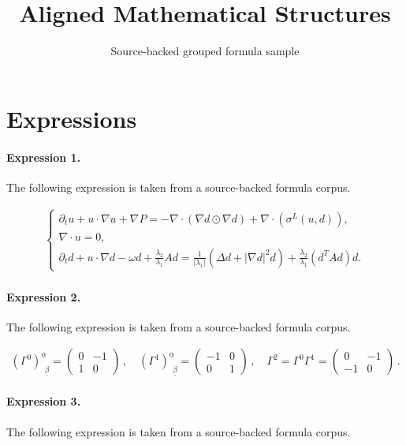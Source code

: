 \documentclass[11pt]{article}
\title{Aligned Mathematical Structures}
\author{Source-backed grouped formula sample}
\date{}
\begin{document}
\maketitle
\section{Expressions}
\paragraph{Expression 1.} The following expression is taken from a source-backed formula corpus.

\begin{align*}\begin{cases}\partial_t u+u\cdot \nabla u+\nabla P=-\nabla\cdot(\nabla d\odot\nabla d)+\nabla\cdot(\sigma^L(u,d)),\\\nabla\cdot u = 0,\\\partial_t d+u\cdot\nabla d-\omega d+\frac{\lambda_2}{\lambda_1} Ad=\frac{1}{|\lambda_1|}\left(\Delta d+|\nabla d|^2d\right)+\frac{\lambda_2}{\lambda_1}\left(d^TAd\right) d.\end{cases}\end{align*}

\paragraph{Expression 2.} The following expression is taken from a source-backed formula corpus.

\begin{align*}(\Gamma^{0})^{\underline\alpha}_{~~\underline\beta}= \left(\begin{array}{cc}0 & -1\\1 & 0\end{array}\right)\,, \quad(\Gamma^{1})^{\underline\alpha}_{~~\underline\beta}= \left(\begin{array}{cc}-1 & 0\\0 & 1\end{array}\right)\, , \quad \Gamma^2=\Gamma^0\Gamma^1=\left(\begin{array}{cc}0 & -1\\-1 & 0\end{array}\right) \,.\end{align*}

\paragraph{Expression 3.} The following expression is taken from a source-backed formula corpus.
\end{document}
